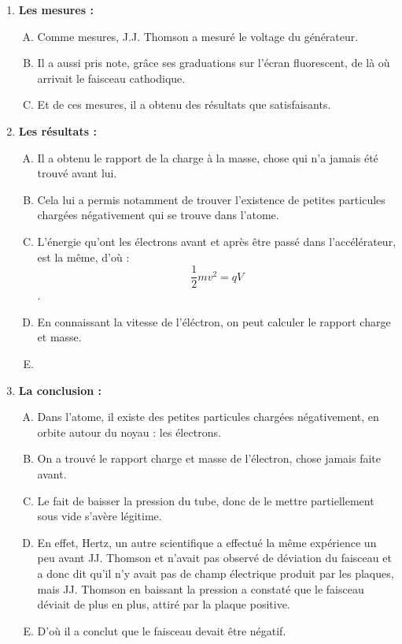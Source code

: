 \documentclass[../main.tex]{subfiles}
\begin{document}
\begin{enumerate}[I]
\begin{enumerate}[A. ]
    \end{enumerate}
    \item \textbf{Les mesures :}
    \begin{enumerate}[A. ]
        \item Comme mesures, J.J. Thomson a mesuré le voltage du générateur.
        \item Il a aussi pris note, grâce ses graduations sur l'écran fluorescent, de là où arrivait le faisceau cathodique.
        \item Et de ces mesures, il a obtenu des résultats que satisfaisants.
    \end{enumerate}
    \item \textbf {Les résultats :}
    \begin{enumerate}[A. ]
        \item Il a obtenu le rapport de la charge à la masse, chose qui n'a jamais été trouvé avant lui.
        \item Cela lui a permis notamment de trouver l'existence de petites particules chargées négativement qui se trouve dans l'atome. 
        \item L'énergie qu'ont les électrons avant et après être passé dans l'accélérateur, est la même, d'où : $$\frac{1}{2}mv^2 = qV$$.
        \item En connaissant la vitesse de l'éléctron, on peut calculer le rapport charge et masse.
        \item
    \end{enumerate}
    \item \textbf {La conclusion :}
    \begin{enumerate}[A. ]
        \item Dans l'atome, il existe des petites particules chargées négativement, en orbite autour du noyau : les électrons.
        \item On a trouvé le rapport charge et masse de l'électron, chose jamais faite avant.
        \item Le fait de baisser la pression du tube, donc de le mettre partiellement sous vide s'avère légitime.
        \item En effet, Hertz, un autre scientifique a effectué la même expérience un peu avant JJ. Thomson et n'avait pas observé de déviation du faisceau et a donc dit qu'il n'y avait pas de champ électrique produit par les plaques, mais JJ. Thomson en baissant la pression a constaté que le faisceau déviait de plus en plus, attiré par la plaque positive.
        \item D'où il a conclut que le faisceau devait être négatif.

\end{enumerate}
\end{enumerate}
\end{document}
